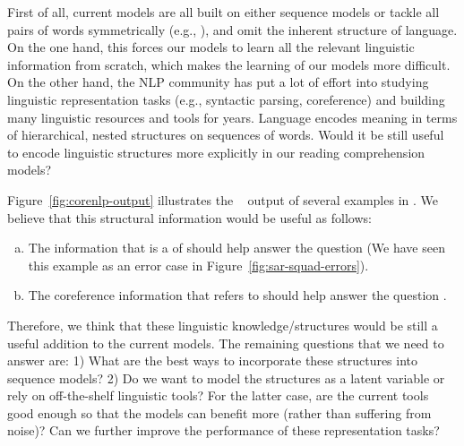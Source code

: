 First of all, current models are all built on either sequence models or tackle all pairs of words symmetrically (e.g., ), and omit the inherent structure of language. On the one hand, this forces our models to learn all the relevant linguistic information from scratch, which makes the learning of our models more difficult. On the other hand, the NLP community has put a lot of effort into studying linguistic representation tasks (e.g., syntactic parsing, coreference) and building many linguistic resources and tools for years. Language encodes meaning in terms of hierarchical, nested structures on sequences of words. Would it be still useful to encode linguistic structures more explicitly in our reading comprehension models?

Figure~\ref{fig:corenlp-output} illustrates the ~\cite{manning2014stanford} output of several examples in . We believe that this structural information would be useful as follows:

\begin{enumerate}[(a)]
    \item
        The information that  is a  of  should help answer the question  (We have seen this example as an error case in Figure~\ref{fig:sar-squad-errors}).
    \item
        The coreference information that  refers to  should help answer the question .
\end{enumerate}

Therefore, we think that these linguistic knowledge/structures would be still a useful addition to the current models. The remaining questions that we need to answer are: 1) What are the best ways to incorporate these structures into sequence models? 2) Do we want to model the structures as a latent variable or rely on off-the-shelf linguistic tools? For the latter case, are the current tools good enough so that the models can benefit more (rather than suffering from noise)? Can we further improve the performance of these representation tasks?

